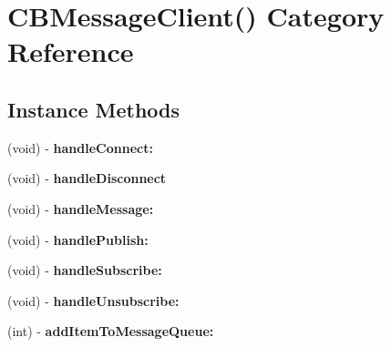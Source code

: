 \hypertarget{category_c_b_message_client_07_08}{\section{C\+B\+Message\+Client() Category Reference}
\label{category_c_b_message_client_07_08}
}
\subsection*{Instance Methods}
\begin{DoxyCompactItemize}
\item 
\hypertarget{category_c_b_message_client_07_08_a8796e44a34e000a06b70041e686bc3bf}{(void) -\/ {\bfseries handle\+Connect\+:}}\label{category_c_b_message_client_07_08_a8796e44a34e000a06b70041e686bc3bf}

\item 
\hypertarget{category_c_b_message_client_07_08_addb1b9213a29dd815c97f705c0865517}{(void) -\/ {\bfseries handle\+Disconnect}}\label{category_c_b_message_client_07_08_addb1b9213a29dd815c97f705c0865517}

\item 
\hypertarget{category_c_b_message_client_07_08_a03b88809c4e42eca1fc342322d44ea3a}{(void) -\/ {\bfseries handle\+Message\+:}}\label{category_c_b_message_client_07_08_a03b88809c4e42eca1fc342322d44ea3a}

\item 
\hypertarget{category_c_b_message_client_07_08_a7c1d0cd4811c5f45aa53bcf18d0faca6}{(void) -\/ {\bfseries handle\+Publish\+:}}\label{category_c_b_message_client_07_08_a7c1d0cd4811c5f45aa53bcf18d0faca6}

\item 
\hypertarget{category_c_b_message_client_07_08_acf8440144373221fb951c279aa3e6038}{(void) -\/ {\bfseries handle\+Subscribe\+:}}\label{category_c_b_message_client_07_08_acf8440144373221fb951c279aa3e6038}

\item 
\hypertarget{category_c_b_message_client_07_08_a6adf38012722dcfb31bf46dd272e6c1c}{(void) -\/ {\bfseries handle\+Unsubscribe\+:}}\label{category_c_b_message_client_07_08_a6adf38012722dcfb31bf46dd272e6c1c}

\item 
\hypertarget{category_c_b_message_client_07_08_a1254860feec88da1f96fdcebc1f5464d}{(int) -\/ {\bfseries add\+Item\+To\+Message\+Queue\+:}}\label{category_c_b_message_client_07_08_a1254860feec88da1f96fdcebc1f5464d}


\end{DoxyCompactItemize}
